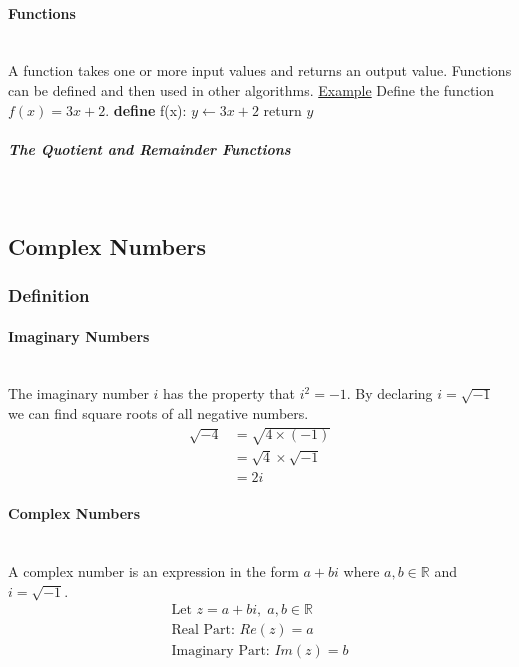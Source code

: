 \documentclass[a4paper]{article}
\begin{document}
				\paragraph{Functions}\mbox{}\\
					A function takes one or more input values and returns an output value. Functions can be defined and then used in other algorithms.\newline\newline
					\underline{Example}\newline
					Define the function $f(x)=3x+2$.\newline
					\textbf{define} f(x):\newline
					\-\hspace{1em}$y\gets 3x+2$\newline
					\-\hspace{1em}return $y$
					\subparagraph{The Quotient and Remainder Functions}\mbox{}\\
		\subsection{Complex Numbers}
			\subsubsection{Definition}
				\paragraph{Imaginary Numbers}\mbox{}\\
					The imaginary number $i$ has the property that $i^2=-1$. By declaring $i=\sqrt{-1}$ we can find square roots of all negative numbers.
					\begin{align*}
						\sqrt{-4}&=\sqrt{4\times(-1)} \\ &=\sqrt{4}\times\sqrt{-1} \\ &=2i
					\end{align*}
				\paragraph{Complex Numbers}\mbox{}\\
					A complex number is an expression in the form $a+bi$ where $a,b\in\mathbb{R}$ and $i=\sqrt{-1}$.
					\begin{equation*}
						\begin{aligned}
							\text{Let }z=a+bi,\;a,b\in\mathbb{R}\\
							\text{Real Part: }Re(z)=a \\
							\text{Imaginary Part: }Im(z)=b \\
						\end{aligned}
					\end{equation*}
\end{document}
